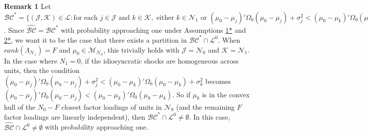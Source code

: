 \documentclass{article}
\begin{document}
\textbf{Remark 1} Let $\mathcal{BC}^* = \{(\mathcal{J},\mathcal{K}) \in \mathcal{L}: \text{for each } j \in \mathcal{J} \text{ and } k \in \mathcal{K},\text{ either } k \in \mathcal{N}_1 \text{ or } 
(\mu_0 - \mu_j)' \Omega_0(\mu_0 - \mu_j) + \sigma_j^2 < (\mu_0 - \mu_k)' \Omega_0(\mu_0 - \mu_k) + \sigma_k^2\}$. Since $\hat{\mathcal{BC}} = \mathcal{BC}^*$ with probability approaching one under Assumptions \hyperref[A1*]{1*} and \hyperref[A2*]{2*}, we want it to be the case that there exists a partition in $\mathcal{BC}^* \cap \mathcal{L}^0$. When  $rank(\Lambda_{\mathcal{N}_1}) = F$ and $\mu_0 \in \mathcal{M}_{\mathcal{N}_0}$, this trivially holds with $\mathcal{J} = \mathcal{N}_0$ and $\mathcal{K} = \mathcal{N}_1$. In the case where $N_1 = 0$, if the idiosyncratic shocks are homogeneous across units, then the condition $(\mu_0 - \mu_j)'\Omega_0(\mu_0 - \mu_j) + \sigma_j^2 < (\mu_0 - \mu_k)' \Omega_0(\mu_0 - \mu_k) + \sigma_k^2$ becomes $(\mu_0 - \mu_j)'\Omega_0(\mu_0 - \mu_j) < (\mu_0 - \mu_k)' \Omega_0(\mu_0 - \mu_k)$. So if $\mu_0$ is in the convex hull of the $N_0 - F$ closest factor loadings of units in $\mathcal{N}_0$ (and the remaining $F$ factor loadings are linearly independent), then $\mathcal{BC}^* \cap \mathcal{L}^0 \neq \emptyset$. In this case, $\hat{\mathcal{BC}} \cap \mathcal{L}^0 \neq \emptyset$ with probability approaching one.
\par 
\end{document}
